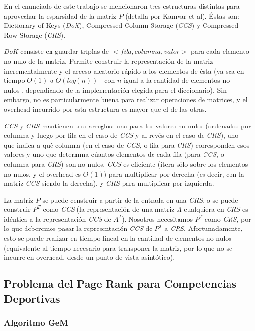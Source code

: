 \par En el enunciado de este trabajo se mencionaron tres estructuras distintas para aprovechar la esparsidad de la matriz $P$ (detalla por Kamvar et al\cite{Kamvar2003}).
\'Estas son: Dictionary of Keys (\textit{DoK}), Compressed Column Storage (\textit{CCS}) y Compressed Row Storage (\textit{CRS}).
\par \textit{DoK} consiste en guardar triplas de $<fila, columna, valor>$ para cada elemento no-nulo de la matriz. 
Permite construir la representaci\'on de la matriz incrementalmente y el acceso aleatorio r\'apido a los elementos de \'esta
(ya sea en tiempo $O(1)$ o $O(log(n))$ - con $n$ igual a la cantidad de elementos no nulos-, dependiendo de la implementaci\'on elegida para el diccionario).
Sin embargo, no es particularmente buena para realizar operaciones de matrices, y el overhead incurrido por esta estructura es mayor que el de las otras.
\par \textit{CCS} y \textit{CRS} mantienen tres arreglos: uno para los valores no-nulos (ordenados por columna y luego por fila en el caso de \textit{CCS} y al rev\'es en el caso de \textit{CRS}),
uno que indica a qu\'e columna (en el caso de \textit{CCS}, o fila para \textit{CRS}) corresponden esos valores y uno que determina c\'uantos elementos de cada fila 
(para \textit{CCS}, o columna para \textit{CRS}) son no-nulos.
\textit{CCS} es eficiente (itera s\'olo sobre los elementos no-nulos, y el overhead es $O(1)$) para multiplicar por derecha (es decir, con la matriz \textit{CCS} siendo la derecha), 
y \textit{CRS} para multiplicar por izquierda.
\par La matriz $P$ se puede construir a partir de la entrada en una \textit{CRS}, o se puede construir $P^T$ como \textit{CCS} (la representaci\'on de una matriz $A$ cualquiera en \textit{CRS}
es id\'entica a la representaci\'on \textit{CCS} de $A^T$). 
Nosotros necesitamos $P^T$ como \textit{CRS}, por lo que deberemos pasar la representaci\'on \textit{CCS} de $P^T$ a \textit{CRS}.
Afortunadamente, esto se puede realizar en tiempo lineal en la cantidad de elementos no-nulos (equivalente al tiempo necesario para transponer la matriz, por lo que no se incurre en overhead, desde
un punto de vista asint\'otico).
	
\subsection{Problema del Page Rank para Competencias Deportivas}

\subsubsection{Algoritmo GeM}

